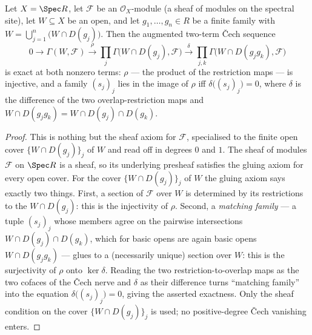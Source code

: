\begin{lemma}
  \label{lem:qcoh_section_equalizer}
  Let \(X = \Spec R\), let \(\mathcal{F}\) be an \(\mathcal{O}_X\)-module (a sheaf of modules on the
  spectral site), let \(W \subseteq X\) be an open, and let \(g_1, \ldots, g_n \in R\) be a finite family
  with \(W = \bigcup_{j=1}^{n} \bigl(W \cap D(g_j)\bigr)\). Then the augmented two-term {\v C}ech sequence
  \[
    0 \longrightarrow \Gamma(W, \mathcal{F})
      \xrightarrow{\ \rho\ } \prod_{j} \Gamma\bigl(W \cap D(g_j), \mathcal{F}\bigr)
      \xrightarrow{\ \delta\ } \prod_{j,k} \Gamma\bigl(W \cap D(g_j g_k), \mathcal{F}\bigr)
  \]
  is exact at both nonzero terms: \(\rho\) — the product of the restriction maps — is injective, and a
  family \((s_j)_j\) lies in the image of \(\rho\) iff \(\delta\bigl((s_j)_j\bigr) = 0\), where
  \(\delta\) is the difference of the two overlap-restriction maps and
  \(W \cap D(g_j g_k) = W \cap D(g_j) \cap D(g_k)\).
\end{lemma}
\begin{proof}

  This is nothing but the sheaf axiom for \(\mathcal{F}\), specialised to the finite open cover
  \(\{W \cap D(g_j)\}_{j}\) of \(W\) and read off in degrees \(0\) and \(1\). The sheaf of modules
  \(\mathcal{F}\) on \(\Spec R\) is a sheaf, so its underlying presheaf satisfies the gluing axiom for
  every open cover. For the cover \(\{W \cap D(g_j)\}_j\) of \(W\) the gluing axiom says exactly two
  things. First, a section of \(\mathcal{F}\) over \(W\) is determined by its restrictions to the
  \(W \cap D(g_j)\): this is the injectivity of \(\rho\). Second, a \emph{matching family} — a tuple
  \((s_j)_j\) whose members agree on the pairwise intersections
  \(W \cap D(g_j) \cap D(g_k)\), which for basic opens are again basic opens \(W \cap D(g_j g_k)\) —
  glues to a (necessarily unique) section over \(W\): this is the surjectivity of \(\rho\) onto
  \(\ker \delta\). Reading the two restriction-to-overlap maps as the two cofaces of the {\v C}ech nerve
  and \(\delta\) as their difference turns ``matching family'' into the equation
  \(\delta\bigl((s_j)_j\bigr) = 0\), giving the asserted exactness. Only the sheaf condition on the cover
  \(\{W \cap D(g_j)\}_j\) is used; no positive-degree {\v C}ech vanishing enters.
\end{proof}

